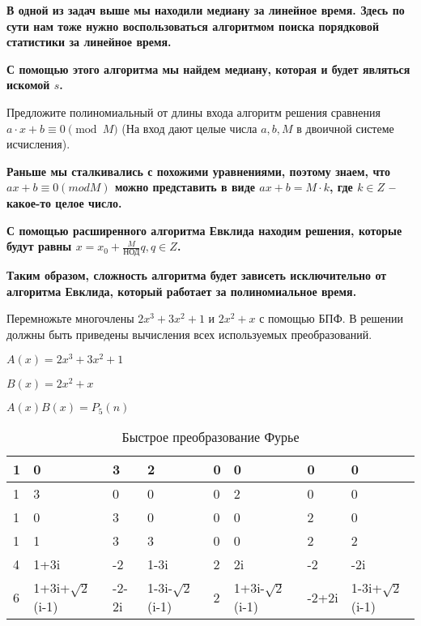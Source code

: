 \documentclass[12pt]{extreport}
\theoremstyle{definiton}
\theoremstyle{definition}
\theoremstyle{definition}
\newcounter{problem}
\newcounter{subproblem}
\def\beforPRskip{
	\bigskip
}
\def\pr{\beforPRskip\noindent\stepcounter{problem}{\bf \theproblem .\;}\setcounter{subproblem}{0}}
\begin{document}
\textbf{В одной из задач выше мы находили медиану за линейное время. Здесь по сути нам тоже нужно воспользоваться алгоритмом поиска порядковой статистики за линейное время.}

\textbf{С помощью этого алгоритма мы найдем медиану, которая и будет являться искомой $s$.}

\pr Предложите полиномиальный от длины входа алгоритм решения сравнения $a\cdot x + b\equiv 0\pmod M$ (На вход дают целые числа $a,b,M$ в двоичной системе исчисления).

\textbf{Раньше мы сталкивались с похожими уравнениями, поэтому знаем, что $ax + b \equiv 0 (mod M)$ можно представить в виде $ax + b = M \cdot k$, где $k \in Z$ -- какое-то целое число.}

\textbf{С помощью расширенного алгоритма Евклида находим решения, которые будут равны $x = x_0 + \frac{M}{\text{НОД}}q, q \in Z$. }

\textbf{Таким образом, сложность алгоритма будет зависеть исключительно от алгоритма Евклида, который работает за полиномиальное время. }

\pr Перемножьте многочлены $2x^3 + 3x^2 + 1$ и $2x^2 + x$ с помощью БПФ. В решении должны быть приведены вычисления всех используемых преобразований.

$A(x) = 2x^3 + 3x^2 + 1$

$B(x) = 2x^2 + x$

$A(x)B(x) = P_5(n)$

\begin{table}[]
	\begin{tabular}{|l|l|l|l|l|l|l|l|}
		\hline
		1                       & 0                    & 3     & 2                    & 0 & 0                    & 0     & 0                    \\ \hline
		1 						& 3                    & 0     & 0                    & 0 & 2                    & 0     & 0                    \\ \hline
		1                       & 0                    & 3     & 0                    & 0 & 0                    & 2     & 0                    \\ \hline
		1                       & 1                    & 3     & 3                    & 0 & 0                    & 2     & 2                    \\ \hline
		4                       & 1+3i                 & -2    & 1-3i                 & 2 & 2i                   & -2    & -2i                  \\ \hline
		6                       & 1+3i+$\sqrt{2}$(i-1) & -2-2i & 1-3i-$\sqrt{2}$(i-1) & 2 & 1+3i-$\sqrt{2}$(i-1) & -2+2i & 1-3i+$\sqrt{2}$(i-1) \\ \hline
	\end{tabular}
	\caption{Быстрое преобразование Фурье}
	\label{tab:my-table}
\end{table}
\end{document}
